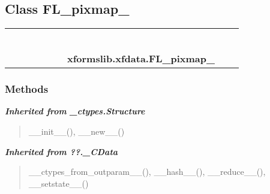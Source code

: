
\subsection{Class FL\_pixmap\_}

    \label{xformslib:xfdata:FL_pixmap_}
\begin{tabular}{cccccccccc}
\multicolumn{2}{r}{\settowidth{\BCL}{object}\multirow{2}{\BCL}{object}}
&&
&&
&&
  \\\cline{3-3}
  &&\multicolumn{1}{c|}{}
&&
&&
&&
  \\
\multicolumn{4}{r}{\settowidth{\BCL}{??.\_CData}\multirow{2}{\BCL}{??.\_CData}}
&&
&&
  \\\cline{5-5}
  &&&&\multicolumn{1}{c|}{}
&&
&&
  \\
\multicolumn{6}{r}{\settowidth{\BCL}{\_ctypes.Structure}\multirow{2}{\BCL}{\_ctypes.Structure}}
&&
  \\\cline{7-7}
  &&&&&&\multicolumn{1}{c|}{}
&&
  \\
&&&&&&\multicolumn{2}{l}{\textbf{xformslib.xfdata.FL\_pixmap\_}}
\end{tabular}



  \subsubsection{Methods}


\large{\textbf{\textit{Inherited from \_ctypes.Structure}}}

\begin{quote}
\_\_init\_\_(), \_\_new\_\_()
\end{quote}

\large{\textbf{\textit{Inherited from ??.\_CData}}}

\begin{quote}
\_\_ctypes\_from\_outparam\_\_(), \_\_hash\_\_(), \_\_reduce\_\_(), \_\_setstate\_\_()
\end{quote}

